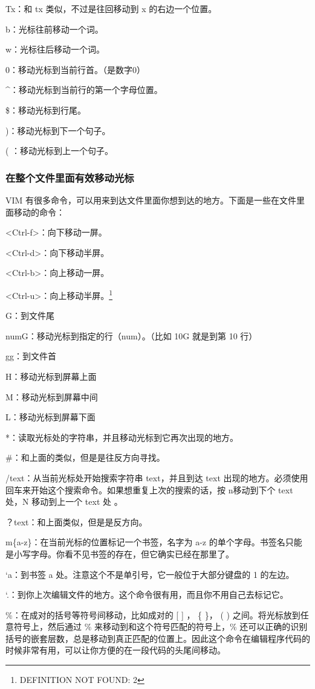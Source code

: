\documentclass[11pt]{article}
\begin{document}
    Tx：和 tx 类似，不过是往回移动到 x 的右边一个位置。

    b：光标往前移动一个词。

    w：光标往后移动一个词。

    0：移动光标到当前行首。（是数字0）

    ^：移动光标到当前行的第一个字母位置。

    \$：移动光标到行尾。

    )：移动光标到下一个句子。

    ( ：移动光标到上一个句子。
\subsubsection{在整个文件里面有效移动光标}
\label{sec-12-5-5}

    VIM 有很多命令，可以用来到达文件里面你想到达的地方。下面是一些在文件里面移动的命令：

    <Ctrl-f>：向下移动一屏。

    <Ctrl-d>：向下移动半屏。

    <Ctrl-b>：向上移动一屏。

    <Ctrl-u>：向上移动半屏。\footnote{DEFINITION NOT FOUND: 2 }

    G：到文件尾

    numG：移动光标到指定的行（num）。（比如 10G 就是到第 10 行）

    gg：到文件首

    H：移动光标到屏幕上面

    M：移动光标到屏幕中间

    L：移动光标到屏幕下面

    *：读取光标处的字符串，并且移动光标到它再次出现的地方。

    \#：和上面的类似，但是是往反方向寻找。

    /text：从当前光标处开始搜索字符串 text，并且到达 text 出现的地方。必须使用回车来开始这个搜索命令。如果想重复上次的搜索的话，按 n移动到下个 text 处，N 移动到上一个 text 处 。

    ？text：和上面类似，但是是反方向。

    m\{a-z\}：在当前光标的位置标记一个书签，名字为 a-z 的单个字母。书签名只能是小写字母。你看不见书签的存在，但它确实已经在那里了。

    `a：到书签 a 处。注意这个不是单引号，它一般位于大部分键盘的 1 的左边。

    `.：到你上次编辑文件的地方。这个命令很有用，而且你不用自己去标记它。

    \%：在成对的括号等符号间移动，比如成对的 [ ] ， \{ \}， ( ) 之间。将光标放到任意符号上，然后通过 \% 来移动到和这个符号匹配的符号上，\% 还可以正确的识别括号的嵌套层数，总是移动到真正匹配的位置上。因此这个命令在编辑程序代码的时候非常有用，可以让你方便的在一段代码的头尾间移动。
\end{document}
